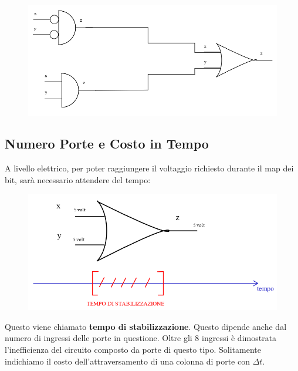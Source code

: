 \documentclass{article}
\begin{document}
\begin{enumerate}
    \begin{figure}[htbp]
        \center
        \includegraphics[scale=0.42]{img/expCircuito1.png}
    \end{figure}
    
\end{enumerate}

\newpage

\subsection{Numero Porte e Costo in Tempo}

A livello elettrico, per poter raggiungere il voltaggio richiesto durante il map dei bit, sarà necessario attendere del tempo:

    \begin{figure}[htbp]
        \center
        \includegraphics[scale=0.55]{img/deltaTempo.png}
    \end{figure}

Questo viene chiamato \textbf{tempo di stabilizzazione}. Questo dipende anche dal numero di ingressi delle porte in questione. Oltre gli $8$ ingressi è dimostrata l'inefficienza del circuito composto da porte di questo tipo. Solitamente indichiamo il costo dell'attraversamento di una colonna di porte con $\Delta t$.

\vspace*{15px}
\end{document}
